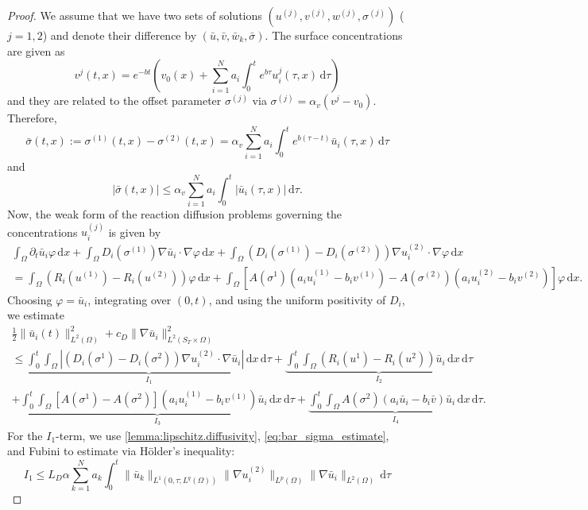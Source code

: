 \documentclass[10pt,a4paper]{amsart}
\newcommand{\di}[1]{\,\mathrm{d}#1}
\begin{document}
\begin{proof}
We assume that we have two sets of solutions $(u^{(j)},v^{(j)},w^{(j)},\sigma^{(j)})$ ($j=1,2$) and denote their difference by $(\bar{u},\bar{v},\bar{w}_k,\bar{\sigma})$.
The surface concentrations are given as
%
\[
v^j(t,x)=e^{-bt}\left(v_0(x)+\sum_{i=1}^Na_i\int_0^te^{b\tau}u_i^j(\tau,x)\di{\tau}\right)
\]
and they are related to the offset parameter $\sigma^{(j)}$ via $\sigma^{(j)}=\alpha_v (v^j-v_0)$.
Therefore, 
\[
\bar{\sigma}(t,x):=\sigma^{(1)}(t,x)-\sigma^{(2)}(t,x)=\alpha_v\sum_{i=1}^N a_i\int_0^te^{b(\tau-t)}\bar{u}_i(\tau,x)\di{\tau}
\]
and
%
\begin{equation}\label{eq:bar_sigma_estimate}
|\bar{\sigma}(t,x)|\leq\alpha_v\sum_{i=1}^N a_i\int_0^t|\bar{u}_i(\tau,x)|\di{\tau}.
\end{equation}
%
Now, the weak form of the reaction diffusion problems governing the concentrations $u_i^{(j)}$ is given by
%
\begin{multline*}
\int_\Omega\partial_t\bar{u}_i\varphi\di{x}+\int_\Omega D_i(\sigma^{(1)})\nabla\bar{u}_i\cdot\nabla\varphi\di{x}
+\int_\Omega\left(D_i(\sigma^{(1)})-D_i(\sigma^{(2)})\right)\nabla u_i^{(2)}\cdot\nabla\varphi\di{x}\\
=\int_\Omega (R_i(u^{(1)})-R_i(u^{(2)}))\varphi\di{x}
+\int_\Omega\left[A(\sigma^1)(a_iu_i^{(1)}- b_iv^{(1)})-A(\sigma^{(2)})(a_iu_i^{(2)}- b_iv^{(2)})\right]\varphi\di{x}.
\end{multline*}
%
Choosing $\varphi=\bar{u}_i$, integrating over $(0,t)$, and using the uniform positivity of $D_i$, we estimate
%
\begin{multline}\label{eq:initial_estimate}
\frac{1}{2}\|\bar{u}_i(t)\|_{L^2(\Omega)}^2+c_D\|\nabla\bar{u}_i\|_{L^2(S_T\times\Omega)}^2\\
\leq\underbrace{\int_0^t\int_\Omega\left|\left(D_i(\sigma^1)-D_i(\sigma^2)\right)\nabla u_i^{(2)}\cdot\nabla\bar{u}_i\right|\di{x}\di{\tau}}_{I_1}
+\underbrace{\int_0^t\int_\Omega (R_i(u^1)-R_i(u^2))\bar{u}_i\di{x}\di{\tau}}_{I_2}\\
+\underbrace{\int_0^t\int_\Omega\left[A(\sigma^1)-A(\sigma^2)\right](a_iu_i^{(1)}- b_iv^{(1)})\bar{u}_i\di{x}\di{\tau}}_{I_3}
+\underbrace{\int_0^t\int_\Omega A(\sigma^2)(a_i\bar{u}_i- b_i\bar{v})\bar{u}_i\di{x}\di{\tau}}_{I_4}.
\end{multline}
%
For the $I_1$-term, we use \cref{lemma:lipschitz.diffusivity}, \cref{eq:bar_sigma_estimate}, and Fubini to estimate via Hölder's inequality:
%
\[
I_1
\leq L_D\alpha\sum_{k=1}^N a_k\int_0^t\|\bar{u}_k\|_{L^1(0,\tau;L^{q}(\Omega))}\|\nabla u_i^{(2)}\|_{L^{p}(\Omega)}\|\nabla\bar{u}_i\|_{L^2(\Omega)}\di{\tau}
\]
\end{proof}
\end{document}
